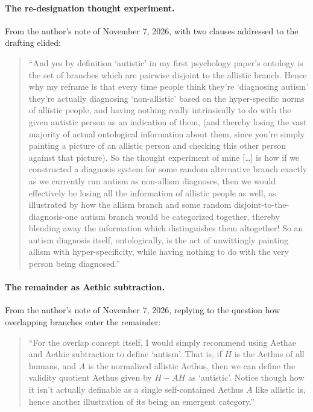 \paragraph{The re-designation thought experiment.} From the author's note of November 7, 2026, with two clauses addressed to the drafting elided:
\begin{quote}
``And yes by definition `autistic' in my first psychology paper's ontology is the set of branches which are pairwise disjoint to the allistic branch. Hence why my reframe is that every time people think they're `diagnosing autism' they're actually diagnosing `non-allistic' based on the hyper-specific norms of allistic people, and having nothing really intrinsically to do with the given autistic person as an indication of them, (and thereby losing the vast majority of actual ontological information about them, since you're simply painting a picture of an allistic person and checking this other person against that picture). So the thought experiment of mine [\ldots] is how if we constructed a diagnosis system for some random alternative branch exactly as we currently run autism as non-allism diagnoses, then we would effectively be losing all the information of allistic people as well, as illustrated by how the allism branch and some random disjoint-to-the-diagnosis-one autism branch would be categorized together, thereby blending away the information which distinguishes them altogether! So an autism diagnosis itself, ontologically, is the act of unwittingly painting allism with hyper-specificity, while having nothing to do with the very person being diagnosed.''
\end{quote}

\paragraph{The remainder as Aethic subtraction.} From the author's note of November 7, 2026, replying to the question how overlapping branches enter the remainder:
\begin{quote}
``For the overlap concept itself, I would simply recommend using Aethae and Aethic subtraction to define `autism'. That is, if $H$ is the Aethus of all humans, and $A$ is the normalized allistic Aethus, then we can define the validity quotient Aethus given by $H - AH$ as `autistic'. Notice though how it isn't actually definable as a single self-contained Aethus $A$ like allistic is, hence another illustration of its being an emergent category.''
\end{quote}

